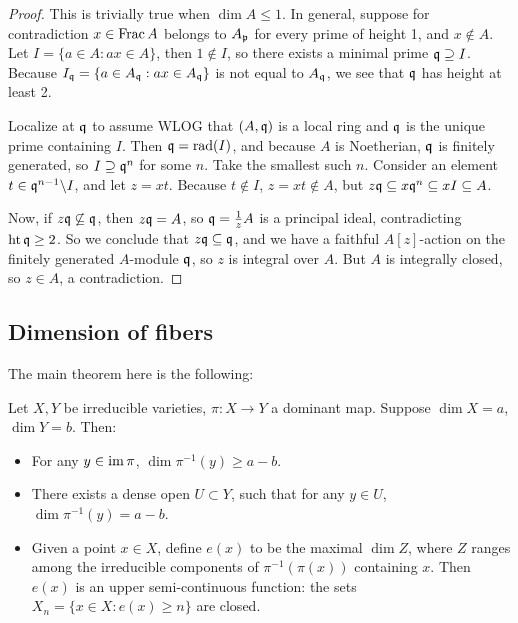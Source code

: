 \documentclass[11pt]{amsart}
\begin{document}
\begin{proof}
    This is trivially true when $\dim A \le 1$. In general, suppose for contradiction $x\in \operatorname{Frac} A$ belongs to $A_{\mathfrak{p}}$ for every prime of height 1, and $x\notin A$. Let $I = \{a\in A: ax\in A\}$, then $1\notin I$, so there exists a minimal prime $\mathfrak{q}\supseteq I$. Because $I_{\mathfrak{q}} = \{a\in A_{\mathfrak{q}}: ax\in A_{\mathfrak{q}}\}$ is not equal to $A_{\mathfrak{q}}$, we see that $\mathfrak{q}$ has height at least 2.

    Localize at $\mathfrak{q}$ to assume WLOG that $(A,\mathfrak{q})$ is a local ring and $\mathfrak{q}$ is the unique prime containing $I$. Then $\mathfrak{q} = \operatorname{rad}(I)$, and because $A$ is Noetherian, $\mathfrak{q}$ is finitely generated, so $I\supseteq \mathfrak{q}^n$ for some $n$. Take the smallest such $n$. Consider an element $t\in \mathfrak{q}^{n-1}\backslash I$, and let $z = xt$. Because $t\notin I$, $z = xt \notin A$, but $z\mathfrak{q} \subseteq x\mathfrak{q}^n \subseteq xI \subseteq A$. 

    Now, if $z\mathfrak{q} \not\subseteq \mathfrak{q}$, then $z\mathfrak{q} = A$, so $\mathfrak{q} = \frac{1}{z}A$ is a principal ideal, contradicting $\operatorname{ht} \mathfrak{q} \ge 2$. So we conclude that $z\mathfrak{q}\subseteq \mathfrak{q}$, and we have a faithful $A[z]$-action on the finitely generated $A$-module $\mathfrak{q}$, so $z$ is integral over $A$. But $A$ is integrally closed, so $z\in A$, a contradiction.
\end{proof}

\subsection{Dimension of fibers}

The main theorem here is the following:

\begin{thm}
    Let $X,Y$ be irreducible varieties, $\pi:X\to Y$ a dominant map. Suppose $\dim X = a$, $\dim Y = b$. Then:
    \begin{itemize}
        \item For any $y\in \operatorname{im}\pi$, $\dim \pi^{-1}(y)\ge a - b$.
        \item There exists a dense open $U\subset Y$, such that for any $y\in U$, $\dim \pi^{-1}(y) = a - b$.
        \item Given a point $x\in X$, define $e(x)$ to be the maximal $\dim Z$, where $Z$ ranges among the irreducible components of $\pi^{-1}(\pi(x))$ containing $x$. Then $e(x)$ is an upper semi-continuous function: the sets $X_n = \{x\in X: e(x)\ge n\}$ are closed.
    \end{itemize}
\end{thm}
\end{document}
